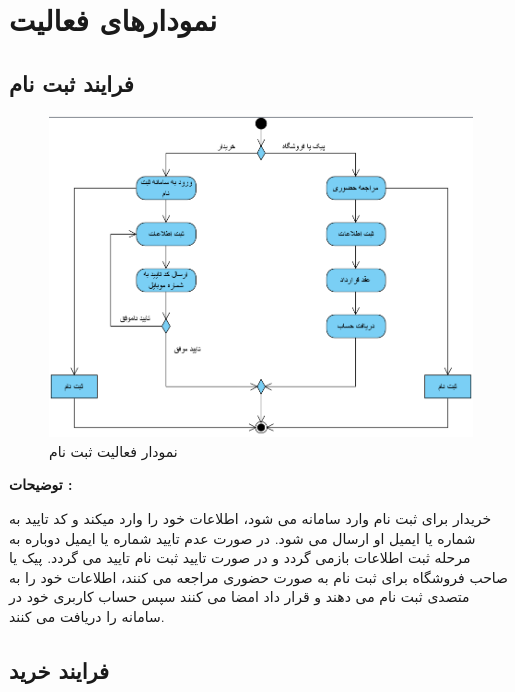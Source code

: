 \documentclass[12pt,a4paper]{article}
\begin{document}
\section{نمودارهای فعالیت} \label{section.activity}
	\subsection{فرایند ثبت نام} \label{section.activity.register}
		\begin{figure}[h!]
			\begin{center}
				\includegraphics[width=14cm]{images/Register Activity Diagram.png}
			\end{center}
			\caption{نمودار فعالیت ثبت نام}
		\end{figure}
	
	\textbf{توضیحات :} 
	
	
	خریدار برای ثبت نام وارد سامانه می شود، اطلاعات خود را وارد میکند و کد تایید به شماره یا ایمیل او ارسال می شود. در صورت عدم تایید شماره یا ایمیل دوباره به مرحله ثبت اطلاعات بازمی گردد و در صورت تایید ثبت نام تایید می گردد.	پیک یا صاحب فروشگاه برای ثبت نام به صورت حضوری مراجعه می کنند، اطلاعات خود را به متصدی ثبت نام می دهند و قرار داد امضا می کنند سپس حساب کاربری خود در سامانه را دریافت می کنند.
\pagebreak	
	\subsection{فرایند خرید} \label{section.activity.buy}
	
	
	
\end{document}
